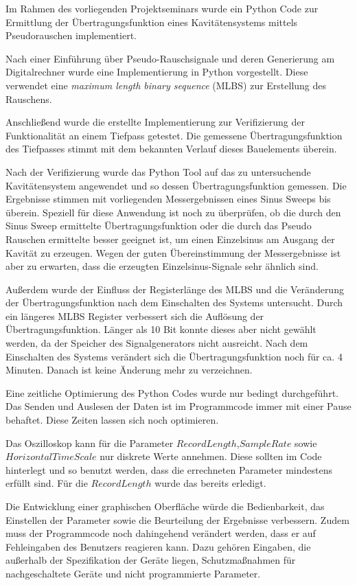 \documentclass[12pt,report,final,twoside,accentcolor=tud9b,bigchapter]{tudreport}
\begin{document}
Im Rahmen des vorliegenden Projektseminars wurde ein Python Code zur Ermittlung der Übertragungsfunktion eines Kavitätensystems mittels Pseudorauschen implementiert. 

Nach einer Einführung über Pseudo-Rauschsignale und deren Generierung am Digitalrechner wurde eine Implementierung in Python vorgestellt. Diese verwendet eine \textit{maximum length binary sequence} (MLBS) zur Erstellung des Rauschens. 

Anschließend wurde die erstellte Implementierung zur Verifizierung der Funktionalität an einem Tiefpass getestet. Die gemessene Übertragungsfunktion des Tiefpasses stimmt mit dem bekannten Verlauf dieses Bauelements überein.

Nach der Verifizierung wurde das Python Tool auf das zu untersuchende Kavitätensystem angewendet und so dessen Übertragungsfunktion gemessen. Die Ergebnisse stimmen mit vorliegenden Messergebnissen eines Sinus Sweeps bis überein. 
Speziell für diese Anwendung ist noch zu überprüfen, ob die durch den
Sinus Sweep ermittelte Übertragungsfunktion oder die durch das Pseudo
Rauschen ermittelte besser geeignet ist, um einen Einzelsinus am Ausgang
der Kavität zu erzeugen. Wegen der guten Übereinstimmung der Messergebnisse ist aber zu erwarten, dass die erzeugten Einzelsinus-Signale sehr ähnlich sind. 

Außerdem wurde der Einfluss der Registerlänge des MLBS und die Veränderung der Übertragungsfunktion nach dem Einschalten des Systems untersucht. Durch ein längeres MLBS Register verbessert sich die Auflösung der Übertragungsfunktion. Länger als 10 Bit konnte dieses aber nicht gewählt werden, da der Speicher des Signalgenerators nicht ausreicht. 
Nach dem Einschalten des Systems verändert sich die Übertragungsfunktion noch für ca. 4 Minuten. Danach ist keine Änderung mehr zu verzeichnen. 

Eine zeitliche Optimierung des Python Codes wurde nur bedingt
durchgeführt. Das Senden und Auslesen der Daten ist im Programmcode
immer mit einer Pause behaftet. Diese Zeiten lassen sich noch optimieren.

Das Oszilloskop kann für die Parameter $RecordLength$,$SampleRate$ sowie $HorizontalTimeScale$ nur diskrete Werte annehmen. Diese sollten im Code hinterlegt und so benutzt werden, dass die errechneten Parameter mindestens erfüllt sind. Für die $RecordLength$ wurde das bereits erledigt.

Die Entwicklung einer graphischen Oberfläche würde die Bedienbarkeit,
das Einstellen der Parameter sowie die Beurteilung der Ergebnisse
verbessern.
Zudem muss der Programmcode noch dahingehend verändert werden, dass er
auf Fehleingaben des Benutzers reagieren kann. Dazu gehören Eingaben, die
außerhalb der Spezifikation der Geräte liegen, Schutzmaßnahmen für
nachgeschaltete Geräte und nicht programmierte Parameter.
\end{document}
